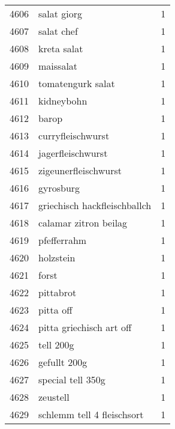 \begin{tabular}{llr}
4606 &                                        salat giorg &      1 \\
4607 &                                         salat chef &      1 \\
4608 &                                        kreta salat &      1 \\
4609 &                                          maissalat &      1 \\
4610 &                                  tomatengurk salat &      1 \\
4611 &                                         kidneybohn &      1 \\
4612 &                                              barop &      1 \\
4613 &                                  curryfleischwurst &      1 \\
4614 &                                  jagerfleischwurst &      1 \\
4615 &                               zigeunerfleischwurst &      1 \\
4616 &                                          gyrosburg &      1 \\
4617 &                       griechisch hackfleischballch &      1 \\
4618 &                              calamar zitron beilag &      1 \\
4619 &                                        pfefferrahm &      1 \\
4620 &                                          holzstein &      1 \\
4621 &                                              forst &      1 \\
4622 &                                          pittabrot &      1 \\
4623 &                                          pitta off &      1 \\
4624 &                           pitta griechisch art off &      1 \\
4625 &                                          tell 200g &      1 \\
4626 &                                       gefullt 200g &      1 \\
4627 &                                  special tell 350g &      1 \\
4628 &                                           zeustell &      1 \\
4629 &                         schlemm tell 4 fleischsort &      1 \\

\end{tabular}
